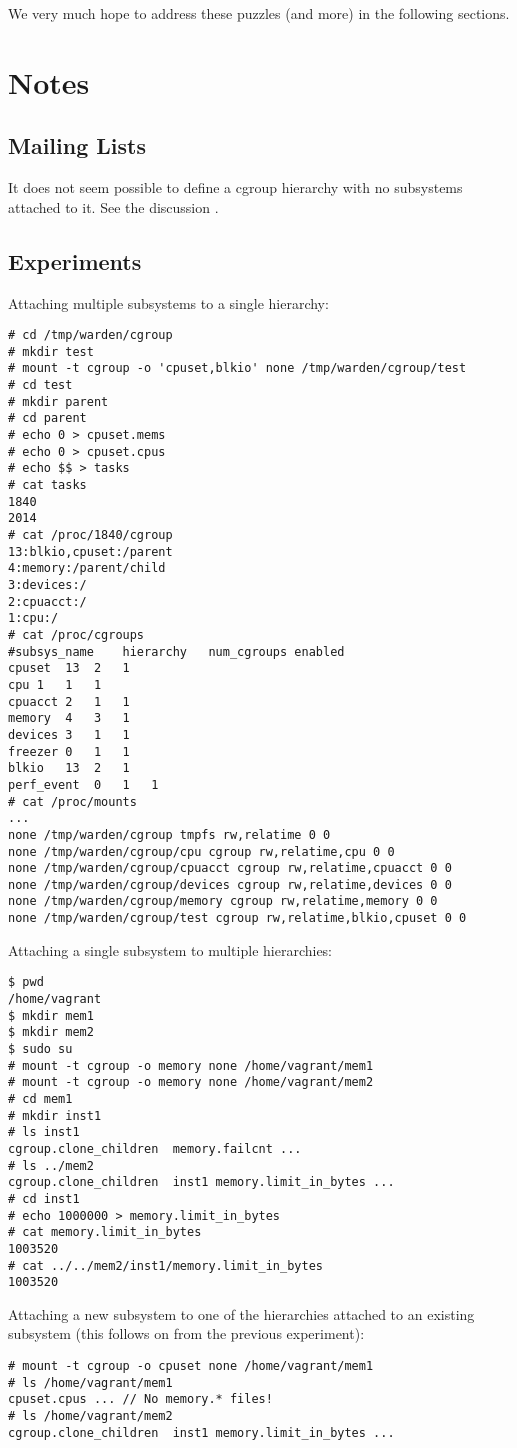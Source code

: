 \documentclass[a4paper,twoside,12pt]{article}
\begin{document}
We very much hope to address these puzzles (and more) in the following sections.

\section{Notes}
\subsection{Mailing Lists}
It does not seem possible to define a cgroup hierarchy with no subsystems attached to it.
See the discussion \cite{noop}.

\subsection{Experiments}
Attaching multiple subsystems to a single hierarchy:
\begin{verbatim}
# cd /tmp/warden/cgroup
# mkdir test
# mount -t cgroup -o 'cpuset,blkio' none /tmp/warden/cgroup/test
# cd test
# mkdir parent
# cd parent
# echo 0 > cpuset.mems 
# echo 0 > cpuset.cpus
# echo $$ > tasks
# cat tasks
1840
2014
# cat /proc/1840/cgroup
13:blkio,cpuset:/parent
4:memory:/parent/child
3:devices:/
2:cpuacct:/
1:cpu:/
# cat /proc/cgroups
#subsys_name	hierarchy	num_cgroups	enabled
cpuset	13	2	1
cpu	1	1	1
cpuacct	2	1	1
memory	4	3	1
devices	3	1	1
freezer	0	1	1
blkio	13	2	1
perf_event	0	1	1
# cat /proc/mounts 
...
none /tmp/warden/cgroup tmpfs rw,relatime 0 0
none /tmp/warden/cgroup/cpu cgroup rw,relatime,cpu 0 0
none /tmp/warden/cgroup/cpuacct cgroup rw,relatime,cpuacct 0 0
none /tmp/warden/cgroup/devices cgroup rw,relatime,devices 0 0
none /tmp/warden/cgroup/memory cgroup rw,relatime,memory 0 0
none /tmp/warden/cgroup/test cgroup rw,relatime,blkio,cpuset 0 0
\end{verbatim}
Attaching a single subsystem to multiple hierarchies:
\begin{verbatim}
$ pwd   
/home/vagrant
$ mkdir mem1
$ mkdir mem2
$ sudo su
# mount -t cgroup -o memory none /home/vagrant/mem1
# mount -t cgroup -o memory none /home/vagrant/mem2
# cd mem1
# mkdir inst1  
# ls inst1 
cgroup.clone_children  memory.failcnt ...
# ls ../mem2
cgroup.clone_children  inst1 memory.limit_in_bytes ...
# cd inst1
# echo 1000000 > memory.limit_in_bytes 
# cat memory.limit_in_bytes 
1003520
# cat ../../mem2/inst1/memory.limit_in_bytes 
1003520
\end{verbatim}
Attaching a new subsystem to one of the hierarchies attached to an existing subsystem (this follows on from the previous experiment):
\begin{verbatim}
# mount -t cgroup -o cpuset none /home/vagrant/mem1
# ls /home/vagrant/mem1
cpuset.cpus ... // No memory.* files!
# ls /home/vagrant/mem2
cgroup.clone_children  inst1 memory.limit_in_bytes ...
\end{verbatim}
\end{document}
